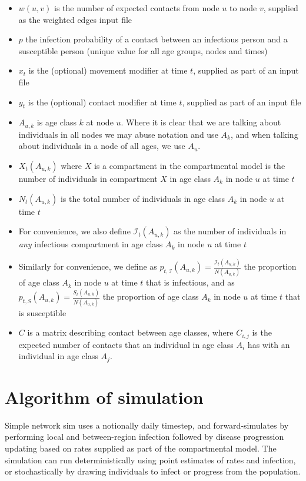 \documentclass[11pt]{article}
\begin{document}
\begin{itemize}
\item $w(u, v)$ is the number of expected contacts from node $u$ to node $v$, supplied as the weighted edges input file
\item $p$ the infection probability of a contact between an infectious person and a susceptible person (unique value for all age groups, nodes and times)
\item $x_t$ is the (optional) movement modifier at time $t$, supplied as part of an input file
\item $y_t$ is the (optional) contact modifier at time $t$, supplied as part of an input file
\item $A_{u,k}$ is age class $k$ at node $u$. Where it is clear that we are talking about individuals in all nodes we may abuse notation and use $A_k$, and when talking about individuals in a node of all ages, we use $A_u$.
\item $X_t(A_{u,k})$ where $X$ is a compartment in the compartmental model is the number of individuals in compartment $X$ in age class $A_k$ in node $u$ at time $t$
\item $N_t(A_{u,k})$ is the total number of individuals in age class $A_k$ in node $u$ at time $t$
\item For convenience, we also define $\mathcal{I}_t(A_{u,k})$ as the number of individuals in \emph{any} infectious compartment in age class $A_k$ in node $u$ at time $t$
\item Similarly for convenience, we define as $p_{t, \mathcal{I}}(A_{u,k}) = \frac{\mathcal{I}_t(A_{u,k})}{N(A_{u,k})}$ the proportion of age class $A_k$ in node $u$ at time $t$ that is infectious, and as $p_{t, S}(A_{u,k}) = \frac{S_t(A_{u,k})}{N(A_{u,k})}$ the proportion of age class $A_k$ in node $u$ at time $t$ that is susceptible
\item $C$ is a matrix describing contact between age classes, where $C_{i,j}$ is the expected number of contacts that an individual in age class $A_i$ has with an individual in age class $A_j$.
\end{itemize}


\section{Algorithm of simulation}

Simple network sim uses a notionally daily timestep, and forward-simulates by performing local and between-region infection followed by disease progression updating based on rates supplied as part of the compartmental model.  The simulation can run deterministically using point estimates of rates and infection, or stochastically by drawing individuals to infect or progress from the population.  
\end{document}
